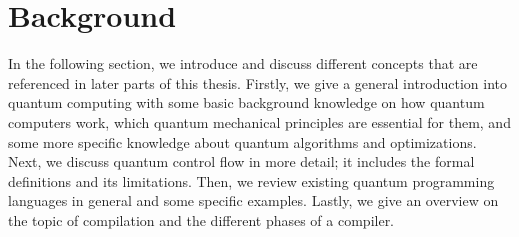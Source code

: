 \chapter{Background}
\label{ch:background}
In the following section, we introduce and discuss different concepts that are referenced in later parts of this thesis. Firstly, we give a general introduction into quantum computing with some basic background knowledge on how quantum computers work, which quantum mechanical principles are essential for them, and some more specific knowledge about quantum algorithms and optimizations. Next, we discuss quantum control flow in more detail; it includes the formal definitions and its limitations. Then, we review existing quantum programming languages in general and some specific examples. Lastly, we give an overview on the topic of compilation and the different phases of a compiler. 







